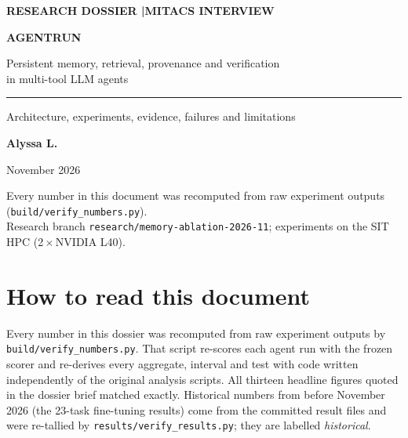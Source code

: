 \documentclass[10.5pt,a4paper,oneside]{report}
\begin{document}
\begin{titlepage}
\color{ink}
\vspace*{3.2cm}
{\sffamily\color{accent}\small\bfseries RESEARCH DOSSIER \quad|\quad MITACS INTERVIEW\par}
\vspace{0.6cm}
{\sffamily\fontsize{40}{44}\selectfont\bfseries AGENTRUN\par}
\vspace{0.5cm}
{\sffamily\Large Persistent memory, retrieval, provenance and verification\\ in multi-tool LLM agents\par}
\vspace{0.4cm}
{\color{accent}\rule{\linewidth}{1pt}\par}
\vspace{0.4cm}
{\large Architecture, experiments, evidence, failures and limitations\par}
\vfill
{\sffamily\large\bfseries Alyssa L.\par}
{ November 2026\par}
\vspace{0.8cm}
{\small\color{muted} Every number in this document was recomputed from raw experiment outputs (\texttt{build/verify\_numbers.py}).\\
Research branch \texttt{research/memory-ablation-2026-11}; experiments on the SIT HPC (2\,$\times$\,NVIDIA L40).\par}
\end{titlepage}
\tableofcontents
\clearpage
{}
\chapter*{How to read this document}
Every number in this dossier was recomputed from raw experiment outputs by \texttt{build/\allowbreak{}verify\_\allowbreak{}numbers.\allowbreak{}py}. That script re-scores each agent run with the frozen scorer and re-derives every aggregate, interval and test with code written independently of the original analysis scripts. All thirteen headline figures quoted in the dossier brief matched exactly. Historical numbers from before November 2026 (the 23-task fine-tuning results) come from the committed result files and were re-tallied by \texttt{results/\allowbreak{}verify\_\allowbreak{}results.\allowbreak{}py}; they are labelled \emph{historical}.
\end{document}
